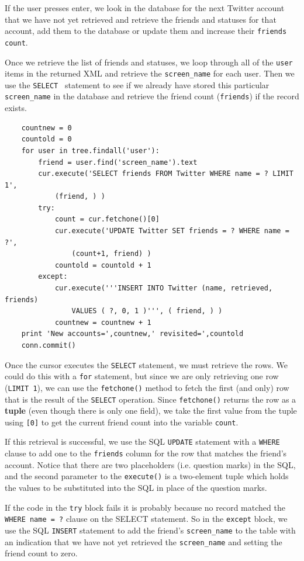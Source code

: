 \documentclass[11pt]{book}
\begin{document}
If the user presses enter, we look in the database for the next 
Twitter account that we have not yet retrieved and retrieve the
friends and statuses for that account, add them to the database 
or update them and increase their {\tt friends count}.

Once we retrieve the list of friends and statuses, we loop 
through all of the {\tt user} items in the returned XML
and retrieve the \verb"screen_name" for each user.  Then we use
the {\tt SELECT } statement to see if we already have stored this
particular \verb"screen_name" in the database and retrieve the
friend count ({\tt friends}) if the record exists.

\beforeverb
\begin{verbatim}
    countnew = 0
    countold = 0
    for user in tree.findall('user'):
        friend = user.find('screen_name').text
        cur.execute('SELECT friends FROM Twitter WHERE name = ? LIMIT 1', 
            (friend, ) )
        try:
            count = cur.fetchone()[0]
            cur.execute('UPDATE Twitter SET friends = ? WHERE name = ?', 
                (count+1, friend) )
            countold = countold + 1
        except:
            cur.execute('''INSERT INTO Twitter (name, retrieved, friends) 
                VALUES ( ?, 0, 1 )''', ( friend, ) )
            countnew = countnew + 1
    print 'New accounts=',countnew,' revisited=',countold
    conn.commit()
\end{verbatim}
\afterverb
%
Once the cursor executes the {\tt SELECT} statement, 
we must retrieve the rows.  We could do this with a {\tt for} 
statement, but since we are only retrieving
one row ({\tt LIMIT 1}), we can use the {\tt fetchone()} method to fetch the
first (and only) row that is the result of the {\tt SELECT} operation.  
Since {\tt fetchone()} returns the row as a {\bf tuple} (even though there is only
one field), we take the first value from the tuple using {\tt [0]} to get the 
current friend count into the variable {\tt count}.  

If this retrieval is successful, we use the SQL {\tt UPDATE} statement with a 
{\tt WHERE} clause to add one to the {\tt friends} column for the row that 
matches the friend's account.  Notice that there are two placeholders (i.e.
question marks) in the SQL, and the second parameter to the {\tt execute()} is
a two-element tuple which holds the values to be substituted into the SQL
in place of the question marks.

If the code in the {\tt try} block fails it is probably because no record
matched the {\tt WHERE name = ?} clause on the SELECT statement.  So in the
{\tt except} block, we use the SQL {\tt INSERT} statement to add the friend's
\verb"screen_name" to the table with an indication that we have not yet 
retrieved the \verb"screen_name" and setting the friend count to zero.
\end{document}
